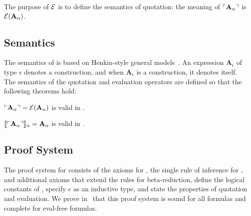 \documentclass[fleqn]{llncs}
\begin{document}
The purpose of $\mbox{$\cal E$}$ is to define the semantics of quotation: the
meaning of $\ulcorner\textbf{A}_\alpha\urcorner$ is $\mbox{$\cal E$}(\textbf{A}_\alpha)$.

\subsection{Semantics}

The semantics of {\churchqe} is based on Henkin-style general
models~\cite{Henkin50}.  An expression $\textbf{A}_\epsilon$ of type
$\epsilon$ denotes a construction, and when $\textbf{A}_\epsilon$ is a
construction, it denotes itself.  The semantics of the quotation and
evaluation operators are defined so that the following theorems hold:

\begin{thm} \label{thm:sem-quotation}
$\ulcorner\textbf{A}_\alpha\urcorner = \mbox{$\cal E$}(\textbf{A}_\alpha)$ is valid in
  {\churchqe}.
\end{thm}

\begin{thm} \label{thm:sem-disquotation}
$\llbracket\ulcorner\textbf{A}_\alpha\urcorner\rrbracket_\alpha = \textbf{A}_\alpha$
  is valid in {\churchqe}.
\end{thm}


\subsection{Proof System}

The proof system for {\churchqe} consists of the axioms for {\qzero},
the single rule of inference for {\qzero}, and additional axioms that
extend the rules for beta-reduction, define the logical constants of
{\churchqe}, specify $\epsilon$ as an inductive type, and state the
properties of quotation and evaluation.  We prove
in~\cite{FarmerArxiv16} that this proof system is sound for all
formulas and complete for eval-free formulas.
\end{document}

